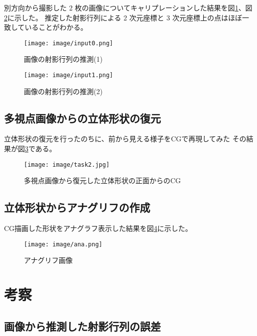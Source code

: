 \documentclass[11pt,a4j]{jsarticle}
\makeatletter
\newcommand{\figcaption}[1]{\def\@captype{figure}\caption{#1}}
\makeatother
\begin{document}
別方向から撮影した 2 枚の画像についてキャリプレーションした結果を図\ref{fig:input0}、図\ref{fig:input1}に示した。
推定した射影行列による 2 次元座標と 3 次元座標上の点はほぼ一致していることがわかる。

\begin{figure}[H]
  \centering
  \texttt{[image: image/input0.png]}
  \figcaption{画像の射影行列の推測(1)}
  \label{fig:input0}
\end{figure}

\begin{figure}[H]
  \centering
  \texttt{[image: image/input1.png]}
  \figcaption{画像の射影行列の推測(2)}
  \label{fig:input1}
\end{figure}


\subsection{多視点画像からの立体形状の復元}
\label{sub:result_multimage}

立体形状の復元を行ったのちに、前から見える様子をCGで再現してみた
その結果が図\ref{fig:capture}である。

\begin{figure}[H]
  \centering
  \texttt{[image: image/task2.jpg]}
  \figcaption{多視点画像から復元した立体形状の正面からのCG}
  \label{fig:capture}
\end{figure}



\subsection{立体形状からアナグリフの作成}
\label{sub:result_anaglyph}

CG描画した形状をアナグラフ表示した結果を図\ref{fig:anaglyph}に示した。


\begin{figure}[H]
  \centering
  \texttt{[image: image/ana.png]}
  \figcaption{アナグリフ画像}
  \label{fig:anaglyph}
\end{figure}


\section{考察}
\label{sec:考察}

\subsection{画像から推測した射影行列の誤差}
\label{sub:画像から推測した射影行列の誤差}
\end{document}
